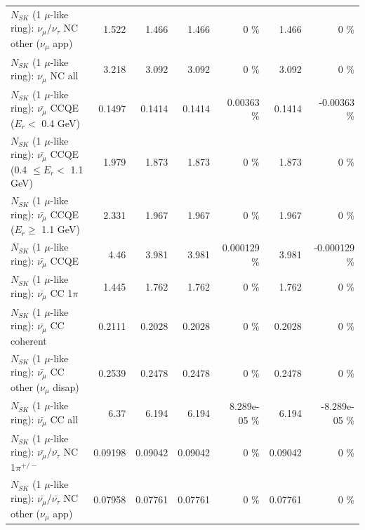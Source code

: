 \begin{table}
\begin{tabular}{| l | r | r | r  r | r  r |}
     $N_{SK}$ (1 $\mu$-like ring): $\nu_\mu$/$\nu_\tau$ NC other ($\nu_\mu$ app) &           1.522 &           1.466 &           1.466 &        0 \%  &           1.466 &        0 \%  \\ 
                                $N_{SK}$ (1 $\mu$-like ring): $\nu_{\mu}$ NC all &           3.218 &           3.092 &           3.092 &        0 \%  &           3.092 &        0 \%  \\ 
\hline
\hline
\hline
          $N_{SK}$ (1 $\mu$-like ring): $\bar{\nu_\mu}$ CCQE ($E_{r} <$ 0.4 GeV) &          0.1497 &          0.1414 &          0.1414 &  0.00363 \%  &          0.1414 & -0.00363 \%  \\ 
 $N_{SK}$ (1 $\mu$-like ring): $\bar{\nu_\mu}$ CCQE (0.4 $\leq E_{r} <$ 1.1 GeV) &           1.979 &           1.873 &           1.873 &        0 \%  &           1.873 &        0 \%  \\ 
       $N_{SK}$ (1 $\mu$-like ring): $\bar{\nu_\mu}$ CCQE ($E_{r} \geq$ 1.1 GeV) &           2.331 &           1.967 &           1.967 &        0 \%  &           1.967 &        0 \%  \\ 
\hline
                              $N_{SK}$ (1 $\mu$-like ring): $\bar{\nu_\mu}$ CCQE &            4.46 &           3.981 &           3.981 & 0.000129 \%  &           3.981 & -0.000129 \%  \\ 
                         $N_{SK}$ (1 $\mu$-like ring): $\bar{\nu_\mu}$ CC 1$\pi$ &           1.445 &           1.762 &           1.762 &        0 \%  &           1.762 &        0 \%  \\ 
                       $N_{SK}$ (1 $\mu$-like ring): $\bar{\nu_\mu}$ CC coherent &          0.2111 &          0.2028 &          0.2028 &        0 \%  &          0.2028 &        0 \%  \\ 
        $N_{SK}$ (1 $\mu$-like ring): $\bar{\nu_\mu}$ CC other ($\nu_\mu$ disap) &          0.2539 &          0.2478 &          0.2478 &        0 \%  &          0.2478 &        0 \%  \\ 
                          $N_{SK}$ (1 $\mu$-like ring): $\bar{\nu_{\mu}}$ CC all &            6.37 &           6.194 &           6.194 & 8.289e-05 \%  &           6.194 & -8.289e-05 \%  \\ 
\hline
  $N_{SK}$ (1 $\mu$-like ring): $\bar{\nu_\mu}$/$\bar{\nu_\tau}$ NC 1$\pi^{+/-}$ &         0.09198 &         0.09042 &         0.09042 &        0 \%  &         0.09042 &        0 \%  \\ 
$N_{SK}$ (1 $\mu$-like ring): $\bar{\nu_\mu}$/$\bar{\nu_\tau}$ NC other ($\nu_\mu$ app) &         0.07958 &         0.07761 &         0.07761 &        0 \%  &         0.07761 &        0 \%  \\ 

\end{tabular}
\end{table}
